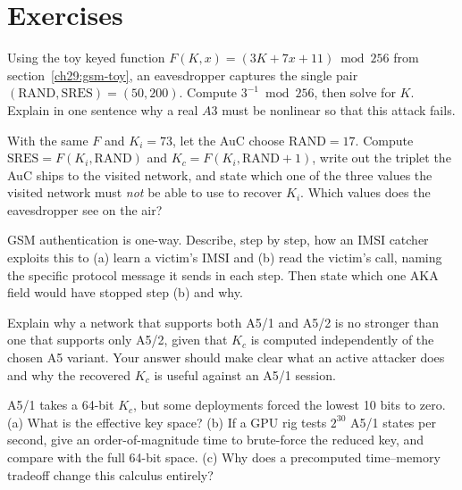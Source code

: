 \section{Exercises}
\label{ch29:exercises}

\begin{exercise}
Using the toy keyed function $F(K,x) = (3K + 7x + 11)\bmod 256$ from section~\ref{ch29:gsm-toy}, an eavesdropper captures the single pair $(\text{RAND},\text{SRES}) = (50, 200)$. Compute $3^{-1} \bmod 256$, then solve for $K$. Explain in one sentence why a real $A3$ must be nonlinear so that this attack fails.
\end{exercise}

\begin{exercise}
With the same $F$ and $K_i = 73$, let the AuC choose $\text{RAND}=17$. Compute $\text{SRES}=F(K_i,\text{RAND})$ and $K_c=F(K_i,\text{RAND}+1)$, write out the triplet the AuC ships to the visited network, and state which one of the three values the visited network must \emph{not} be able to use to recover $K_i$. Which values does the eavesdropper see on the air?
\end{exercise}

\begin{exercise}
GSM authentication is one-way. Describe, step by step, how an IMSI catcher exploits this to (a) learn a victim's IMSI and (b) read the victim's call, naming the specific protocol message it sends in each step. Then state which one AKA field would have stopped step (b) and why.
\end{exercise}

\begin{exercise}
Explain why a network that supports both A5/1 and A5/2 is no stronger than one that supports only A5/2, given that $K_c$ is computed independently of the chosen A5 variant. Your answer should make clear what an active attacker does and why the recovered $K_c$ is useful against an A5/1 session.
\end{exercise}

\begin{exercise}
A5/1 takes a 64-bit $K_c$, but some deployments forced the lowest 10 bits to zero. (a) What is the effective key space? (b) If a GPU rig tests $2^{30}$ A5/1 states per second, give an order-of-magnitude time to brute-force the reduced key, and compare with the full 64-bit space. (c) Why does a precomputed time--memory tradeoff change this calculus entirely?
\end{exercise}

